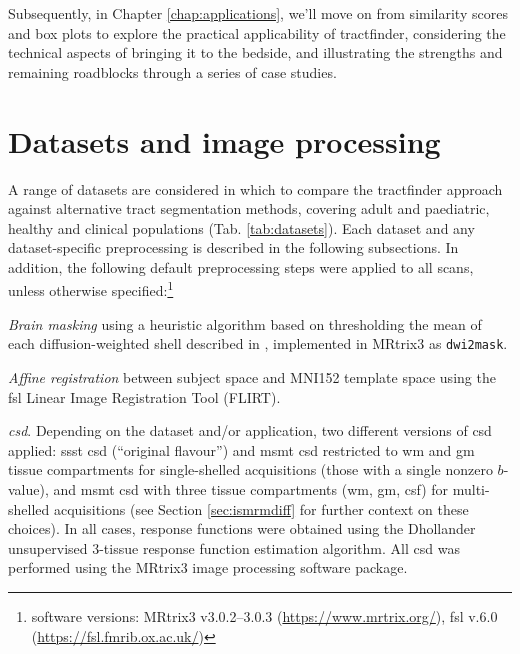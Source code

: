\documentclass[12pt,phd,a4paper,twoside]{ucl_thesis}
\renewcommand{\textcite}[2][]{
\ifthenelse { \equal {#1} {} }  {\citeauthor{#2}\autocite{#2}}   {\citeauthor{#1}\autocite{#2}}}
\begin{document}
Subsequently, in Chapter \ref{chap:applications}, we'll move on from similarity scores and box plots to explore the practical applicability of tractfinder, considering the technical aspects of bringing it to the bedside, and illustrating the strengths and remaining roadblocks through a series of case studies.

\section{Datasets and image processing}
\label{sec:data}

A range of datasets are considered in which to compare the tractfinder approach against alternative tract segmentation methods, covering adult and paediatric, healthy and clinical populations (Tab. \ref{tab:datasets}).
Each dataset and any dataset-specific preprocessing is described in the following subsections.
In addition, the following default preprocessing steps were applied to all scans, unless otherwise specified:\footnote[2]{software versions: MRtrix3 v3.0.2--3.0.3 (\url{https://www.mrtrix.org/}), \gls{fsl} v.6.0 (\url{https://fsl.fmrib.ox.ac.uk/})}

\textit{Brain masking}\autocite{Tournier2019}
using a heuristic algorithm based on thresholding the mean of each diffusion-weighted shell described in \textcite{Dhollander2016}, implemented in MRtrix3\autocite{Tournier2019} as \verb|dwi2mask|.

\textit{Affine registration} between subject space and MNI152\autocite{Fonov2011} template space using the \gls{fsl} Linear Image Registration Tool (FLIRT)\autocite{Jenkinson2001,Jenkinson2002}.

\textit{\Gls{csd}}. Depending on the dataset and/or application, two different versions of \gls{csd} applied: \gls{ssst} \gls{csd}\autocite{Tournier2007,Tournier2019} (``original flavour'') and \gls{msmt} \gls{csd}\autocite{Jeurissen2014} restricted to \gls{wm} and \gls{gm} tissue compartments for single-shelled acquisitions (those with a single nonzero $b$-value),
and \gls{msmt} \gls{csd} with three tissue compartments (\gls{wm}, \gls{gm}, \gls{csf}) for multi-shelled acquisitions (see Section \ref{sec:ismrmdiff} for further context on these choices).
In all cases, response functions were obtained using the Dhollander unsupervised 3-tissue response function estimation algorithm\autocite{Dhollander2016,Dhollander2019}.
All \gls{csd} was performed using the MRtrix3 image processing software package\autocite{Tournier2019}.
\end{document}
